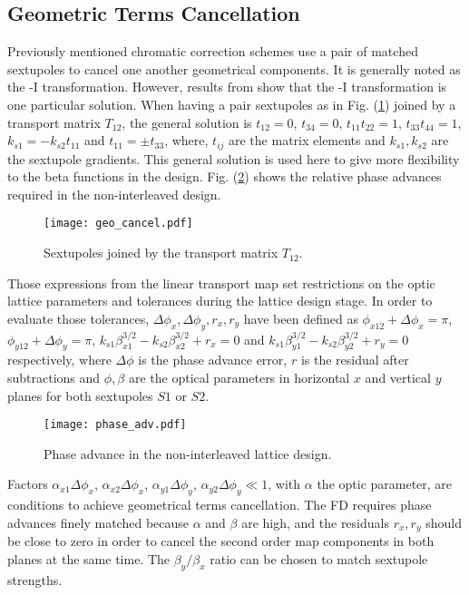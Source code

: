  \subsection{Geometric Terms Cancellation}
Previously mentioned chromatic correction schemes use a pair of matched sextupoles to cancel one another geometrical components. It is generally noted as the -I transformation. However, results from \cite{PhysRevSTAB.8.104002} show that the -I transformation is one particular solution. When having a pair sextupoles as in Fig. (\ref{f:sext}) joined by a transport matrix $T_{12}$, the general solution is $t_{12}=0$, $t_{34}=0$, $t_{11}t_{22}=1$, $t_{33}t_{44}=1$, $k_{s1}=-k_{s2}t_{11}$ and $t_{11}=\pm t_{33}$, where, $t_{ij}$ are the matrix elements and $k_{s1}, k_{s2}$ are the sextupole gradients. This general solution is used here to give more flexibility to the beta functions in the design. Fig. (\ref{f:phaseadv}) shows the relative phase advances required in the non-interleaved design.\par
\begin{figure}[!htb]
   \centering
   \texttt{[image: geo\_cancel.pdf]}
   \caption{Sextupoles joined by the transport matrix $T_{12}$.}
   \label{f:sext}
\end{figure}
Those expressions from the linear transport map set restrictions on the optic lattice parameters and tolerances during the lattice design stage. In order to evaluate those tolerances, $\Delta\phi_x, \Delta\phi_y, r_x, r_y$ have been defined as $\phi_{x12}+\Delta\phi_{x} = \pi$, $\phi_{y12}+\Delta\phi_{y} = \pi$, $ k_{s1}\beta_{x1}^{3/2}-k_{s2}\beta_{x2}^{3/2}+r_x=0$ and $k_{s1}\beta_{y1}^{3/2}-k_{s2}\beta_{y2}^{3/2}+r_y=0$ respectively, where $\Delta\phi$ is the phase advance error, $r$ is the residual after subtractions and $\phi,\beta$ are the optical parameters in horizontal $x$ and vertical $y$ planes for both sextupoles $S1$ or $S2$.\par
\begin{figure}[!htb]
   \centering
   \texttt{[image: phase\_adv.pdf]}
   \caption{Phase advance in the non-interleaved lattice design.}\label{f:phaseadv}
\end{figure}
Factors $\alpha_{x1}\Delta\phi_x$, $\alpha_{x2}\Delta\phi_x$, $\alpha_{y1}\Delta\phi_y$, $\alpha_{y2}\Delta\phi_y\ll1$, with $\alpha$ the optic parameter, are conditions to achieve geometrical terms cancellation. The FD requires phase advances finely matched because $\alpha$ and $\beta$ are high, and the residuals $r_x,r_y$ should be close to zero in order to cancel the second order map components in both planes at the same time. The $\beta_y/\beta_x$ ratio can be chosen to match sextupole strengths.\par

